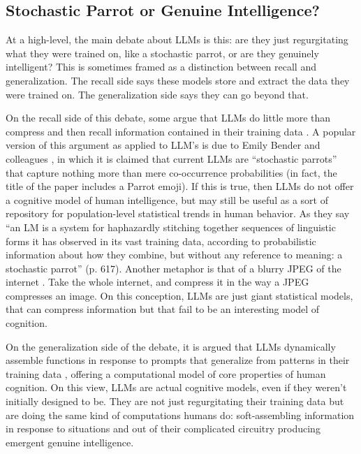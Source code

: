 \subsection{Stochastic Parrot or Genuine Intelligence?}\label{stochasticParrot}

At a high-level, the main debate about LLMs is this: are they just
regurgitating what they were trained on, like a stochastic parrot, or are they
genuinely intelligent? This is sometimes framed as a distinction between recall
and generalization. The recall side says these models store and extract the
data they were trained on. The generalization side says they can go beyond
that.

On the recall side of this debate, some argue that LLMs do little more than
compress and then recall information contained in their training data
\cite{bender2021dangers, chiang2023jpeg}. A popular version of this argument
as applied to LLM's is due to Emily Bender and colleagues
\cite{bender2021dangers}, in which it is claimed that current LLMs are
``stochastic parrots'' that capture nothing more than mere co-occurrence
probabilities (in fact, the title of the paper includes a Parrot emoji). If
this is true, then LLMs do not offer a cognitive model of human intelligence,
but may still be useful as a sort of repository for population-level
statistical trends in human behavior. As they say ``an LM is a system for
haphazardly stitching together sequences of linguistic forms it has observed in
its vast training data, according to probabilistic information about how they
combine, but without any reference to meaning: a stochastic parrot'' (p. 617).
Another metaphor is that of a blurry JPEG of the internet
\cite{chiang2023jpeg}. Take the whole internet, and compress it in the way a
JPEG compresses an image. On this conception, LLMs are just giant statistical
models, that can compress information but that fail to be an interesting model of cognition.

On the generalization side of the debate, it is argued that LLMs dynamically
assemble functions in response to prompts that generalize from patterns in
their training data \cite{kello2024emergent}, offering a computational model of
core properties of human cognition. On this view, LLMs are actual cognitive
models, even if they weren't initially designed to be. They are not just
regurgitating their training data but are doing the same kind of computations
humans do: soft-assembling information in response to situations and out of
their complicated circuitry producing emergent genuine intelligence.

